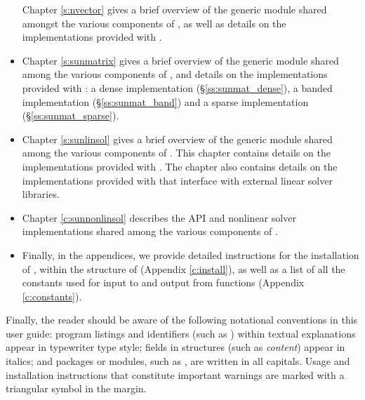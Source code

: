 \begin{itemize}
  Chapter \ref{s:nvector} gives a brief overview of the generic
  {\nvector} module shared amongst the various components of
  {\sundials}, as well as details on the {\nvector}
  implementations provided with {\sundials}.
\item
Chapter \ref{s:sunmatrix} gives a brief overview of the generic
  {\sunmatrix} module shared among the various components of
  {\sundials}, and details on the {\sunmatrix} implementations
  provided with {\sundials}:
  a dense implementation (\S\ref{ss:sunmat_dense}),
  a banded implementation (\S\ref{ss:sunmat_band}) and
  a sparse implementation (\S\ref{ss:sunmat_sparse}).
\item
  Chapter \ref{s:sunlinsol} gives a brief overview of the generic
  {\sunlinsol} module shared among the various components of
  {\sundials}.  This chapter contains details on the {\sunlinsol}
  implementations provided with {\sundials}.
  The chapter
  also contains details on the {\sunlinsol} implementations provided
  with {\sundials} that interface with external linear solver
  libraries.
\item
  Chapter \ref{c:sunnonlinsol} describes the {\sunnonlinsol} API and nonlinear
  solver implementations shared among the various components of {\sundials}.
\item
  Finally, in the appendices, we provide detailed instructions for the installation
  of {\idas}, within the structure of {\sundials} (Appendix \ref{c:install}), as
  well as a list of all the constants used for input to and output from {\idas}
  functions
  (Appendix \ref{c:constants}).
\end{itemize}

Finally, the reader should be aware of the following notational conventions
in this user guide:  program listings and identifiers (such as )
within textual explanations appear in typewriter type style;
fields in {\CC} structures (such as {\em content}) appear in italics;
and packages or modules, such as {\idals}, are written in all capitals.
Usage and installation instructions that constitute important warnings
are marked with a triangular symbol {\warn} in the margin.


